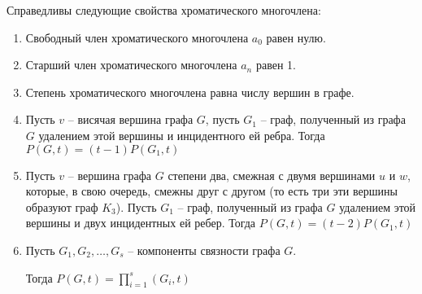 Справедливы следующие свойства хроматического многочлена:
\begin{enumerate}[left=0.0em, labelsep=1em, topsep=0.0em, itemsep=0pt, parsep=0.5em]
    \item Свободный член хроматического многочлена $a_0$ равен нулю.
    \item Старший член хроматического многочлена $a_n$ равен 1.
    \item Степень хроматического многочлена равна числу вершин в графе.
    \item Пусть $v$ -- висячая вершина графа $G$, пусть $G_1$ -- граф, полученный из
    графа $G$ удалением этой вершины и инцидентного ей ребра. Тогда
    $P(G,t) = (t-1) P(G_1,t)$
    \item Пусть $v$ -- вершина графа $G$ степени два, смежная с двумя вершинами $u$
    и $w$, которые, в свою очередь, смежны друг с другом (то есть три эти
    вершины образуют граф $K_3$). Пусть $G_1$ -- граф, полученный из графа $G$
    удалением этой вершины и двух инцидентных ей ребер. Тогда
    $P(G,t) = (t-2) P(G_1,t)$
    \item Пусть $G_1, G_2, \dots, G_s$ -- компоненты связности графа $G$.
    
    Тогда $P(G,t) = \prod_{i=1}^{s}(G_i, t)$
\end{enumerate}